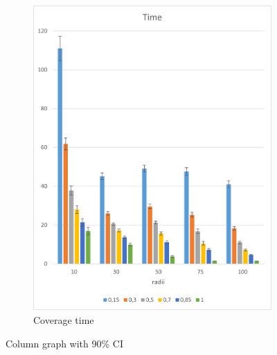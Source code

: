 \begin{figure}[h!]
\begin{subfigure}{.5\textwidth}
  \includegraphics[width=1\linewidth]{./images/200endtimeCI.png}
  \caption{Coverage time}
  \label{fig:sub2}
\end{subfigure}
\caption{Column graph with 90\% CI}
\label{fig:200-90CI}
\end{figure}


\iffalse

